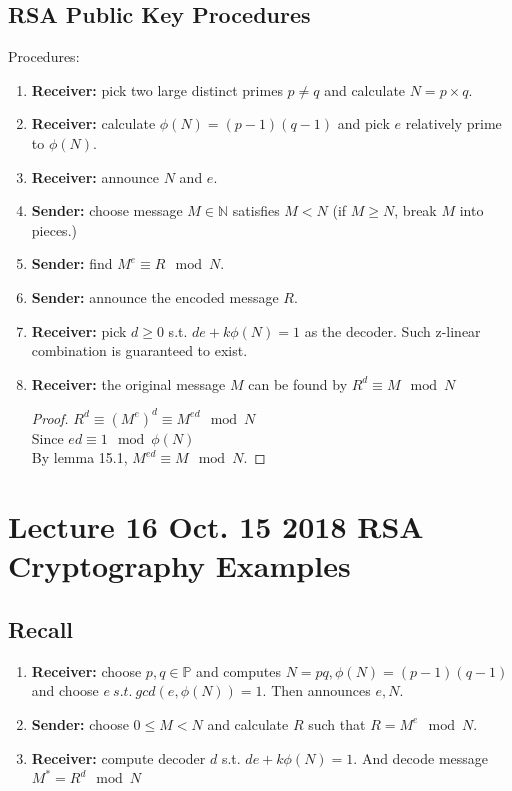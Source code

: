 \documentclass[11pt]{article}
\begin{document}
		\subsection{RSA Public Key Procedures}
		\par Procedures:
		\begin{enumerate}
			\item \textbf{Receiver:} pick two large distinct primes $p \neq q$ and calculate $N = p\times q$.
			\item \textbf{Receiver:} calculate $\phi(N) = (p-1)(q-1)$ and pick $e$ relatively prime to $\phi(N)$. 
			\item \textbf{Receiver:} announce $N$ and $e$.
			\item \textbf{Sender:} choose message $M \in \mathbb{N}$ satisfies $M < N$ (if $M \geq N$, break $M$ into pieces.)
			\item \textbf{Sender:} find $M^e \equiv R \mod N$. 
			\item \textbf{Sender:} announce the encoded message $R$. 
			\item \textbf{Receiver:} pick $d \geq 0$ s.t. $de + k\phi(N) = 1$ as the decoder. Such z-linear combination is guaranteed to exist.
			\item \textbf{Receiver:} the original message $M$ can be found by $R^d \equiv M \mod N$
			\begin{proof}
				$R^d \equiv (M^e)^d \equiv M^{ed} \mod N$ \\
				Since $ed \equiv 1 \mod \phi(N)$ \\
				By lemma 15.1, $M^{ed} \equiv M \mod N$.
			\end{proof}
		\end{enumerate}
	\section{Lecture 16 Oct. 15 2018 RSA Cryptography Examples}
	    \subsection{Recall}
	    \begin{enumerate}
	        \item \textbf{Receiver: } choose $p, q \in \mathbb{P}$ and computes $N = pq, \phi(N)=(p-1)(q-1)$ and choose $e\ s.t.\ gcd(e, \phi(N)) = 1$. Then announces $e, N$.
	        \item \textbf{Sender: } choose $0 \leq M < N$ and calculate $R$ such that $R = M^{e} \mod N$.
	        \item \textbf{Receiver: } compute decoder $d$ s.t. $de + k \phi(N) = 1$. And decode message $M^* = R^d \mod N$
	    \end{enumerate}
	    
\end{document}
